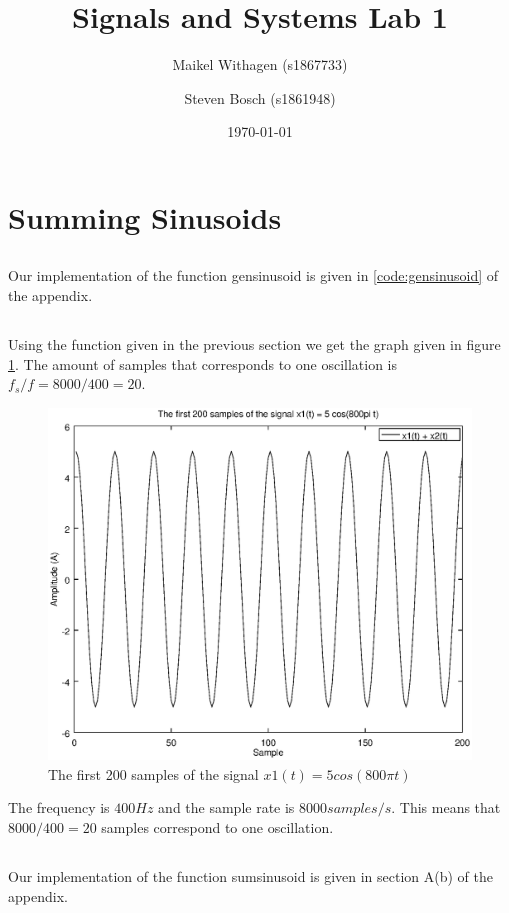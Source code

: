 \documentclass{article}
\title{Signals and Systems Lab 1}
\author{Maikel Withagen (s1867733) \and Steven Bosch (s1861948)}
\date{\today}
\begin{document}
\maketitle

\section{Summing Sinusoids}
\subsection{}
Our implementation of the function gensinusoid is given in \ref{code:gensinusoid} of the appendix.

\subsection{}
Using the function given in the previous section we get the graph given in figure \ref{fig1b}.
The amount of samples that corresponds to one oscillation is $f_s/f=8000/400=20$.
\begin{figure}[H]
  \centering
  \includegraphics[width=.7\columnwidth]{plot1A.eps}
  \caption{The first 200 samples of the signal $x1(t) = 5cos(800\pi t)$}
  \label{fig1b}
\end{figure}
The frequency is $400Hz$ and the sample rate is $8000 samples/s$. This means that $8000/400=20$ samples correspond to one oscillation.

\subsection{}
Our implementation of the function sumsinusoid is given in section A(b) of the appendix.
\end{document}
